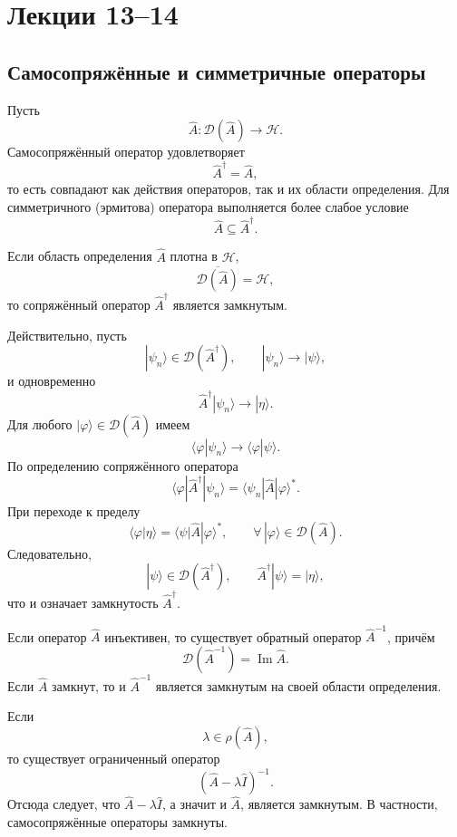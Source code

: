 \documentclass[12pt,a4paper]{article}
\begin{document}
\section{Лекции 13--14}

\subsection{Самосопряжённые и симметричные операторы}

Пусть
\[
    \hat A:\mathcal D(\hat A)\to\mathcal H.
\]
Самосопряжённый оператор удовлетворяет
\[
    \boxed{
        \hat A^\dagger=\hat A
    },
\]
то есть совпадают как действия операторов, так и их области
определения. Для симметричного (эрмитова) оператора выполняется более
слабое условие
\[
    \boxed{
        \hat A\subseteq\hat A^\dagger
    }.
\]

Если область определения $\hat A$ плотна в $\mathcal H$,
\[
    \overline{\mathcal D(\hat A)}=\mathcal H,
\]
то сопряжённый оператор $\hat A^\dagger$ является замкнутым.

Действительно, пусть
\[
    |\psi_n\rangle\in\mathcal D(\hat A^\dagger),
    \qquad
    |\psi_n\rangle\longrightarrow|\psi\rangle,
\]
и одновременно
\[
    \hat A^\dagger|\psi_n\rangle
    \longrightarrow
    |\eta\rangle.
\]
Для любого $|\varphi\rangle\in\mathcal D(\hat A)$ имеем
\[
    \langle\varphi|\psi_n\rangle
    \longrightarrow
    \langle\varphi|\psi\rangle.
\]
По определению сопряжённого оператора
\[
    \langle\varphi|\hat A^\dagger|\psi_n\rangle
    =
    \langle\psi_n|\hat A|\varphi\rangle^*.
\]
При переходе к пределу
\[
    \langle\varphi|\eta\rangle
    =
    \langle\psi|\hat A|\varphi\rangle^*,
    \qquad
    \forall\,|\varphi\rangle\in\mathcal D(\hat A).
\]
Следовательно,
\[
    |\psi\rangle\in\mathcal D(\hat A^\dagger),
    \qquad
    \hat A^\dagger|\psi\rangle=|\eta\rangle,
\]
что и означает замкнутость $\hat A^\dagger$.

Если оператор $\hat A$ инъективен, то существует обратный оператор
$\hat A^{-1}$, причём
\[
    \boxed{
        \mathcal D(\hat A^{-1})
        =
        \operatorname{Im}\hat A
    }.
\]
Если $\hat A$ замкнут, то и $\hat A^{-1}$ является замкнутым на своей
области определения.

Если
\[
    \lambda\in\rho(\hat A),
\]
то существует ограниченный оператор
\[
    (\hat A-\lambda\hat I)^{-1}.
\]
Отсюда следует, что $\hat A-\lambda\hat I$, а значит и $\hat A$,
является замкнутым. В частности, самосопряжённые операторы замкнуты.
\end{document}
